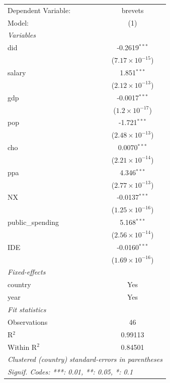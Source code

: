 \begingroup
\centering
\begin{tabular}{lc}
   \tabularnewline \midrule \midrule
   Dependent Variable: & brevets\\  
   Model:              & (1)\\  
   \midrule
   \emph{Variables}\\
   did                 & -0.2619$^{***}$\\   
                       & ($7.17\times 10^{-15}$)\\    
   salary              & 1.851$^{***}$\\   
                       & ($2.12\times 10^{-13}$)\\    
   gdp                 & -0.0017$^{***}$\\   
                       & ($1.2\times 10^{-17}$)\\    
   pop                 & -1.721$^{***}$\\   
                       & ($2.48\times 10^{-13}$)\\    
   cho                 & 0.0070$^{***}$\\   
                       & ($2.21\times 10^{-14}$)\\    
   ppa                 & 4.346$^{***}$\\   
                       & ($2.77\times 10^{-13}$)\\    
   NX                  & -0.0137$^{***}$\\   
                       & ($1.25\times 10^{-16}$)\\    
   public\_spending    & 5.168$^{***}$\\   
                       & ($2.56\times 10^{-14}$)\\    
   IDE                 & -0.0160$^{***}$\\   
                       & ($1.69\times 10^{-16}$)\\    
   \midrule
   \emph{Fixed-effects}\\
   country             & Yes\\  
   year                & Yes\\  
   \midrule
   \emph{Fit statistics}\\
   Observations        & 46\\  
   R$^2$               & 0.99113\\  
   Within R$^2$        & 0.84501\\  
   \midrule \midrule
   \multicolumn{2}{l}{\emph{Clustered (country) standard-errors in parentheses}}\\
   \multicolumn{2}{l}{\emph{Signif. Codes: ***: 0.01, **: 0.05, *: 0.1}}\\
\end{tabular}
\par\endgroup
